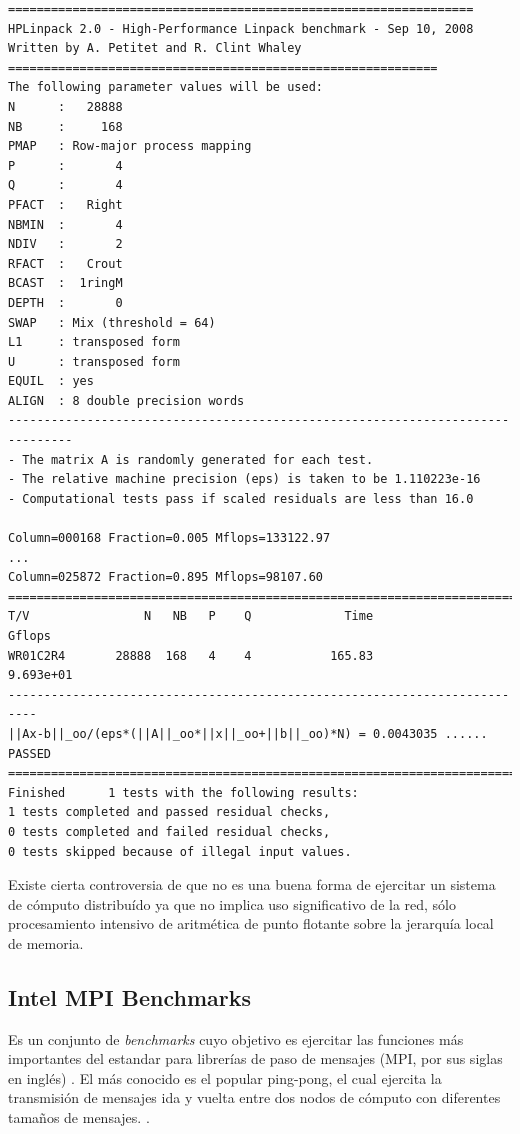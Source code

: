 \documentclass[a4paper]{report}
\begin{document}
{\small
\begin{verbatim}
=================================================================
HPLinpack 2.0 - High-Performance Linpack benchmark - Sep 10, 2008
Written by A. Petitet and R. Clint Whaley
============================================================
The following parameter values will be used:
N      :   28888
NB     :     168
PMAP   : Row-major process mapping
P      :       4
Q      :       4
PFACT  :   Right
NBMIN  :       4
NDIV   :       2
RFACT  :   Crout
BCAST  :  1ringM
DEPTH  :       0
SWAP   : Mix (threshold = 64)
L1     : transposed form
U      : transposed form
EQUIL  : yes
ALIGN  : 8 double precision words
-------------------------------------------------------------------------------
- The matrix A is randomly generated for each test.
- The relative machine precision (eps) is taken to be 1.110223e-16
- Computational tests pass if scaled residuals are less than 16.0

Column=000168 Fraction=0.005 Mflops=133122.97
...
Column=025872 Fraction=0.895 Mflops=98107.60
==========================================================================
T/V                N   NB   P    Q             Time                 Gflops
WR01C2R4       28888  168   4    4           165.83              9.693e+01
--------------------------------------------------------------------------
||Ax-b||_oo/(eps*(||A||_oo*||x||_oo+||b||_oo)*N) = 0.0043035 ...... PASSED
==========================================================================
Finished      1 tests with the following results:
1 tests completed and passed residual checks,
0 tests completed and failed residual checks,
0 tests skipped because of illegal input values.
\end{verbatim}
}

\bigskip

Existe cierta controversia de que no es una buena forma de ejercitar un
sistema de c\'omputo distribu\'ido ya que no implica uso significativo de la
red, s\'olo procesamiento intensivo de aritm\'etica de punto flotante
sobre la jerarqu\'ia local de memoria.

\subsection{Intel MPI Benchmarks}

Es un conjunto de {\it benchmarks} cuyo objetivo es ejercitar las funciones
m\'as importantes del estandar para librer\'ias de paso de mensajes (MPI, por sus siglas en ingl\'es) \cite{mpi}.
El m\'as conocido es el popular ping-pong, el cual ejercita la transmisi\'on de mensajes ida y vuelta entre dos nodos de
c\'omputo con diferentes tama\~nos de mensajes. \cite{latency}.
\end{document}
